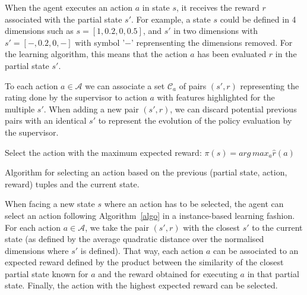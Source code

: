 \documentclass[letterpaper]{article} %
\begin{document}
When the agent executes an action $a$ in state $s$, it receives the reward $r$
associated with the partial state $s'$. For example, a state $s$ could be
defined in 4 dimensions such as ${s=[1,0.2,0,0.5]}$, and $s'$ in two dimensions
with ${s'=[-,0.2,0,-]}$ with symbol '$-$' reprensenting the dimensions removed.
For the learning algorithm, this means that the action $a$ has been evaluated
$r$ in the partial state $s'$.  

To each action $a \in \mathcal{A}$ we can associate a set $\mathcal{C}_{a}$ of
pairs $(s',r)$ representing the rating done by the supervisor to action $a$ with
features highlighted for the multiple $s'$. When adding a new pair $(s',r)$, we
can discard potential previous pairs with an identical $s'$ to represent the
evolution of the policy evaluation by the supervisor.

\begin{algorithm}
    \DontPrintSemicolon
    Select the action with the maximum expected reward:
    $\pi(s) = arg\, max_{a} \hat{r}(a)$

    \caption{Algorithm for selecting an action based on the previous
    (partial state, action, reward) tuples and the current state.}
    \label{algo}
\end{algorithm}

When facing a new state $s$ where an action has to be selected, the agent can
select an action following Algorithm~\ref{algo} in a instance-based learning
fashion. For each action $a \in \mathcal{A}$, we take the pair $(s',r)$ with the
closest $s'$ to the current state (as defined by the average quadratic distance
over the normalised dimensions where $s'$ is defined). That way, each action $a$
can be associated to an expected reward defined by the product between the
similarity of the closest partial state known for $a$ and the reward obtained
for executing $a$ in that partial state.  Finally, the action with the highest
expected reward can be selected.
\end{document}
